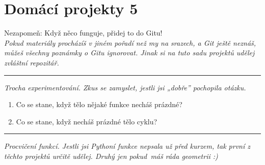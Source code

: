 \documentclass[a4paper,10pt]{article}
\newcommand\plsetno{5}
\newcommand\startsection[1]{
     \vspace{0.2ex}
    \hrule
    {\fontspec{Oxygen} \tiny
     \vspace{-1ex}
     \emph{#1}
     \vspace{-1.5em}
    }
}
\begin{document}
\section*{Domácí projekty \plsetno}

Nezapomeň: Když něco funguje, přidej to do Gitu!
\\\emph{\small Pokud materiály procházíš v jiném pořadí než my na srazech, a Git ještě neznáš, můžeš všechny poznámky o Gitu ignorovat. Jinak si na tuto sadu projektů udělej zvláštní repozitář.}

\vspace{1cm}

\startsection{Trocha experimentování. Zkus se zamyslet, jestli jsi „dobře” pochopila otázku.}

\begin{enumerate}[resume]

\item Co se stane, když tělo nějaké funkce necháš prázdné?

\item Co se stane, když necháš prázdné tělo cyklu?

\end{enumerate}

\startsection{Procvičení funkcí. Jestli jsi Pythoní funkce nepsala už před kurzem, tak první z těchto projektů určitě udělej. Druhý jen pokud máš ráda geometrii :)}
\end{document}
